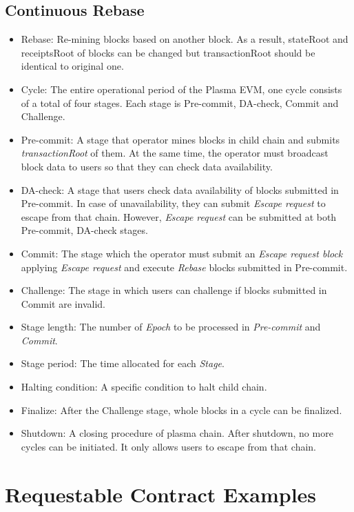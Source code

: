 \documentclass[letterpaper, 11pt]{article}
\begin{document}
\subsection{Continuous Rebase}
\begin{CJK}{UTF8}{mj}
\begin{itemize}
    \item Rebase: Re-mining blocks based on another block. As a result, stateRoot and receiptsRoot of blocks can be changed but transactionRoot should be identical to original one.
   \item Cycle: The entire operational period of the Plasma EVM, one cycle consists of a total of four stages. Each stage is Pre-commit, DA-check, Commit and Challenge.
   \item Pre-commit: A stage that operator mines blocks in child chain and submits \emph{transactionRoot} of them. At the same time, the operator must broadcast block data to users so that they can check data availability.
   \item DA-check: A stage that users check data availability of blocks submitted in Pre-commit. In case of unavailability, they can submit \emph{Escape request} to escape from that chain. However, \emph{Escape request} can be submitted at both Pre-commit, DA-check stages.
   \item Commit: The stage which the operator must submit an \emph{Escape request block} applying \emph{Escape request} and execute \emph{Rebase} blocks submitted in Pre-commit.
   \item Challenge: The stage in which users can challenge if blocks submitted in Commit are invalid.
   \item Stage length: The number of \emph{Epoch} to be processed in \emph{Pre-commit} and \emph{Commit}.
   \item Stage period: The time allocated for each \emph{Stage}.
   \item Halting condition: A specific condition to halt child chain.
   \item Finalize: After the Challenge stage, whole blocks in a cycle can be finalized.
   \item Shutdown: A closing procedure of plasma chain. After shutdown, no more cycles can be initiated. It only allows users to escape from that chain.
\end{itemize}
\end{CJK}

\newpage

\section{Requestable Contract Examples} \label{appendix:requestable-contract-examples}
\end{document}
